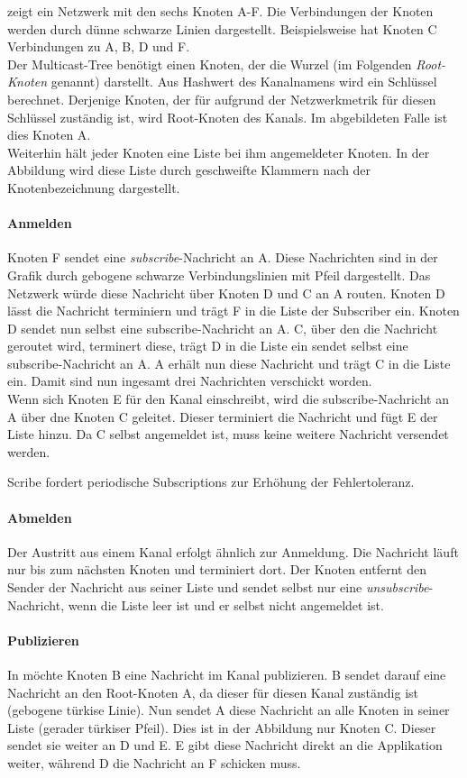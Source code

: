  zeigt ein Netzwerk mit den sechs Knoten A-F. Die Verbindungen der Knoten werden durch dünne schwarze Linien dargestellt. Beispielsweise hat Knoten C Verbindungen zu A, B, D und F.\\
Der Multicast-Tree benötigt einen Knoten, der die Wurzel (im Folgenden \emph{Root-Knoten} genannt) darstellt. Aus Hashwert des Kanalnamens wird ein Schlüssel berechnet. Derjenige Knoten, der für aufgrund der Netzwerkmetrik für diesen Schlüssel zuständig ist, wird Root-Knoten des Kanals. Im abgebildeten Falle ist dies Knoten A.\\
Weiterhin hält jeder Knoten eine Liste bei ihm angemeldeter Knoten. In der Abbildung wird diese Liste durch geschweifte Klammern nach der Knotenbezeichnung dargestellt.

\paragraph*{Anmelden}
Knoten F sendet eine \emph{subscribe}-Nachricht an A. Diese Nachrichten sind in der Grafik durch gebogene schwarze Verbindungslinien mit Pfeil dargestellt. Das Netzwerk würde diese Nachricht über Knoten D und C an A routen. Knoten D lässt die Nachricht terminiern und trägt F in die Liste der Subscriber ein. Knoten D sendet nun selbst eine subscribe-Nachricht an A. C, über den die Nachricht geroutet wird, terminert diese, trägt D in die Liste ein sendet selbst eine subscribe-Nachricht an A. A erhält nun diese Nachricht und trägt C in die Liste ein. Damit sind nun ingesamt drei Nachrichten verschickt worden.\\
Wenn sich Knoten E für den Kanal einschreibt, wird die subscribe-Nachricht an A über dne Knoten C geleitet. Dieser terminiert die Nachricht und fügt E der Liste hinzu. Da C selbst angemeldet ist, muss keine weitere Nachricht versendet werden.

Scribe fordert periodische Subscriptions zur Erhöhung der Fehlertoleranz.

\paragraph*{Abmelden}
Der Austritt aus einem Kanal erfolgt ähnlich zur Anmeldung. Die Nachricht läuft nur bis zum nächsten Knoten und terminiert dort. Der Knoten entfernt den Sender der Nachricht aus seiner Liste und sendet selbst nur eine \emph{unsubscribe}-Nachricht, wenn die Liste leer ist und er selbst nicht angemeldet ist.

\paragraph*{Publizieren}
In  möchte Knoten B eine Nachricht im Kanal publizieren. B sendet darauf eine Nachricht an den Root-Knoten A, da dieser für diesen Kanal zuständig ist (gebogene türkise Linie). Nun sendet A diese Nachricht an alle Knoten in seiner Liste (gerader türkiser Pfeil). Dies ist in der Abbildung nur Knoten C. Dieser sendet sie weiter an D und E. E gibt diese Nachricht direkt an die Applikation weiter, während D die Nachricht an F schicken muss.


